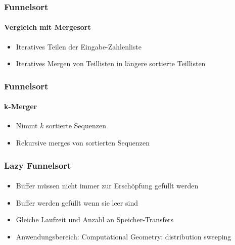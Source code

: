 \documentclass{beamer}
\begin{document}
\begin{frame}
  \frametitle{Funnelsort}
  \framesubtitle{Vergleich mit Mergesort}
  \begin{itemize}
    \item Iteratives Teilen der Eingabe-Zahlenliste
    \item Iteratives Mergen von Teillisten
      in längere sortierte Teillisten
  \end{itemize}
\end{frame}

\begin{frame}
  \frametitle{Funnelsort}
  \framesubtitle{k-Merger}
  \begin{itemize}
    \item Nimmt $k$ sortierte Sequenzen
    \item Rekursive merges von sortierten Sequenzen
  \end{itemize}
\end{frame}

\begin{frame}
  \frametitle{Lazy Funnelsort}
  \framesubtitle{}
  \begin{itemize}
    \item Buffer müssen nicht immer zur Erschöpfung gefüllt werden
    \item Buffer werden gefüllt wenn sie leer sind
    \item Gleiche Laufzeit und Anzahl an Speicher-Transfers
    \item Anwendungsbereich: Computational Geometry: distribution sweeping
  \end{itemize}
\end{frame}
\end{document}
